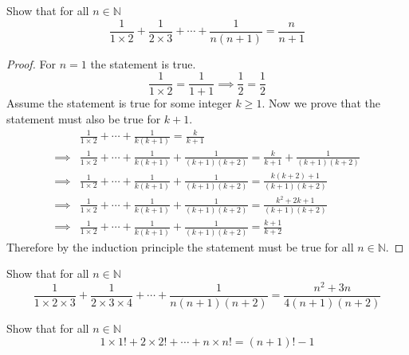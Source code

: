 \documentclass[11pt,numbers=noenddot,svgnames,dvipsnames]{scrartcl}
\begin{document}
\begin{example}
    Show that for all $n\in \mathbb{N}$
    \[
        \frac{1}{1\times 2} + \frac{1}{2 \times 3} + \cdots + \frac{1}{n(n+1)} = \frac{n}{n + 1}
    \]
\end{example}
\begin{proof}
    For $n = 1$ the statement is true.
    \[
        \frac{1}{1 \times 2} = \frac{1}{1 + 1} \implies \frac{1}{2} = \frac{1}{2}
    \]
    Assume the statement is true for some integer $k\geq 1$. Now we prove that the 
    statement must also be true for $k + 1$.
    \begin{align*}
                 & \frac{1}{1 \times 2} + \cdots + \frac{1}{k(k + 1)} = \frac{k}{k + 1} \\
        \implies & \frac{1}{1\times 2} + \cdots + \frac{1}{k(k + 1)} + \frac{1}{(k + 1)(k + 2)} 
        = \frac{k}{k + 1} + \frac{1}{(k +1)(k + 2)} \\
        \implies & \frac{1}{1 \times 2} + \cdots + \frac{1}{k(k + 1)} + \frac{1}{(k + 1)(k + 2)}
        = \frac{k(k + 2) + 1}{(k + 1)(k + 2)} \\
        \implies & \frac{1}{1 \times 2} + \cdots + \frac{1}{k(k + 1)} + \frac{1}{(k + 1)(k + 2)}
        = \frac{k^{2} + 2k + 1}{(k + 1)(k + 2)} \\
        \implies & \frac{1}{1 \times 2} + \cdots + \frac{1}{k(k + 1)} + \frac{1}{(k + 1)(k + 2)}
        = \frac{k + 1}{k + 2}
    \end{align*}
    Therefore by the induction principle the statement must be true for all $n \in \mathbb{N}$.
\end{proof}

\begin{exercise}
    Show that for all $n \in \mathbb{N}$
    \[
        \frac{1}{1 \times 2 \times 3} + \frac{1}{2 \times 3 \times 4} + \cdots + \frac{1}{n(n + 1)(n + 2)} 
        = \frac{n^{2} + 3n}{4(n + 1)(n + 2)}
    \]
\end{exercise}
\begin{exercise}
    Show that for all $n \in \mathbb{N}$
    \[
        1\times 1! + 2\times 2! + \cdots + n\times n! = (n + 1)! - 1
    \]
\end{exercise}
\end{document}
